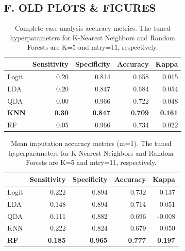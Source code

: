 \documentclass[12pt,]{article}
\begin{document}
\subsection*{F. OLD PLOTS \& FIGURES}\label{f.-old-plots-figures}

\begin{table}[!h]

\caption{\label{tab:unnamed-chunk-20}\label{tab:cc-metrics} Complete case analysis accuracy metrics.  The tuned hyperparameters for K-Nearest Neighbors and Random Forests are K=5 and mtry=11, respectively.}
\centering
\fontsize{10}{12}\selectfont
\begin{tabular}{lrrrr}
\toprule
  & Sensitivity & Specificity & Accuracy & Kappa\\
\midrule
Logit & 0.20 & 0.814 & 0.658 & 0.015\\
LDA & 0.20 & 0.847 & 0.684 & 0.054\\
QDA & 0.00 & 0.966 & 0.722 & -0.048\\
\textbf{KNN} & \textbf{0.30} & \textbf{0.847} & \textbf{0.709} & \textbf{0.161}\\
RF & 0.05 & 0.966 & 0.734 & 0.022\\
\bottomrule
\end{tabular}
\end{table}

\begin{table}[!h]

\caption{\label{tab:unnamed-chunk-21}\label{tab:mean-metrics} Mean imputation accuracy metrics (m=1).  The tuned hyperparameters for K-Nearest Neighbors and Random Forests are K=5 and mtry=11, respectively.}
\centering
\fontsize{10}{12}\selectfont
\begin{tabular}{lrrrr}
\toprule
  & Sensitivity & Specificity & Accuracy & Kappa\\
\midrule
Logit & 0.222 & 0.894 & 0.732 & 0.137\\
LDA & 0.148 & 0.894 & 0.714 & 0.051\\
QDA & 0.111 & 0.882 & 0.696 & -0.008\\
KNN & 0.222 & 0.824 & 0.679 & 0.050\\
\textbf{RF} & \textbf{0.185} & \textbf{0.965} & \textbf{0.777} & \textbf{0.197}\\
\bottomrule
\end{tabular}
\end{table}
\end{document}
